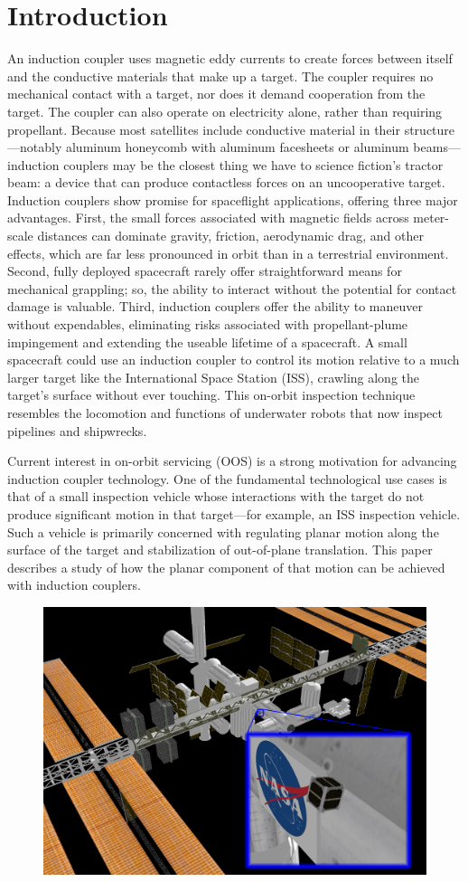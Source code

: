 \section{Introduction} 
An induction coupler uses magnetic eddy currents to create forces between itself and the conductive materials that make up a target. The coupler requires no mechanical contact with a target, nor does it demand cooperation from the target. The coupler can also operate on electricity alone, rather than requiring propellant. Because most satellites include conductive material in their structure—notably aluminum honeycomb with aluminum facesheets or aluminum beams—induction couplers may be the closest thing we have to science fiction's tractor beam: a device that can produce  contactless forces on an uncooperative target. 
Induction couplers show promise for spaceflight applications, offering three major advantages. First, the small forces associated with magnetic fields across meter-scale distances can dominate gravity, friction, aerodynamic drag, and other effects, which are far less pronounced in orbit than in a terrestrial environment. Second, fully deployed spacecraft rarely offer straightforward means for mechanical grappling; so, the ability to interact without the potential for contact damage is valuable. Third, induction couplers offer the ability to maneuver without expendables, eliminating risks associated with propellant-plume impingement and extending the useable lifetime of a spacecraft.
A small spacecraft could use an induction coupler to control its motion relative to a much larger target like the International Space Station (ISS), crawling along the target’s surface without ever touching. This on-orbit inspection technique resembles the locomotion and functions of underwater robots that now inspect pipelines and shipwrecks. 
 
Current interest in on-orbit servicing (OOS) is a strong motivation for advancing induction coupler technology. One of the fundamental technological use cases is that of a small inspection vehicle whose interactions with the target do not produce significant motion in that target—for example, an ISS inspection vehicle. Such a vehicle is primarily concerned with regulating planar motion along the surface of the target and stabilization of out-of-plane translation. This paper  describes a study of how the planar component of that motion can be achieved with induction couplers. 

\begin{figure} 
\includegraphics{figures/iss_inspector.jpg}
\label{fig:issinspector}
\end{figure}

